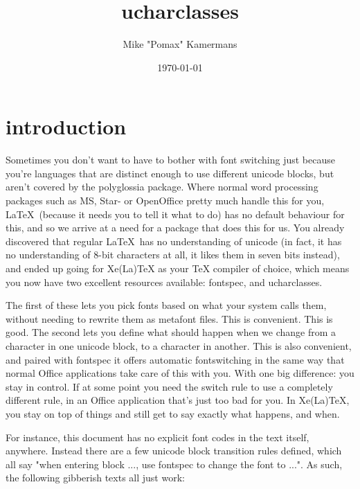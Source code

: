 ﻿\documentclass{article}
\begin{document}
	\title{ucharclasses}
	\author{Mike "Pomax" Kamermans}
	\date{\today}
	\maketitle

	\tableofcontents

	\pagebreak

	\section{introduction}
	
		Sometimes you don't want to have to bother with font switching just because you're languages that are distinct enough to use different unicode blocks, but aren't covered by the polyglossia package. Where normal word processing packages such as MS, Star- or OpenOffice pretty much handle this for you, \LaTeX\ (because it needs you to tell it what to do) has no default behaviour for this, and so we arrive at a need for a package that does this for us. You already discovered that regular \LaTeX\ has no understanding of unicode (in fact, it has no understanding of 8-bit characters at all, it likes them in seven bits instead), and ended up going for Xe(La)TeX as your TeX compiler of choice, which means you now have two excellent resources available: fontspec, and ucharclasses.
		
		The first of these lets you pick fonts based on what your system calls them, without needing to rewrite them as metafont files. This is convenient. This is good. The second lets you define what should happen when we change from a character in one unicode block, to a character in another. This is also convenient, and paired with fontspec it offers automatic fontswitching in the same way that normal Office applications take care of this with you. With one big difference: you stay in control. If at some point you need the switch rule to use a completely different rule, in an Office application that's just too bad for you. In Xe(La)TeX, you stay on top of things and still get to say exactly what happens, and when.
		
		For instance, this document has no explicit font codes in the text itself, anywhere. Instead there are a few unicode block transition rules defined, which all say "when entering block ..., use fontspec to change the font to ...". As such, the following gibberish texts all just work:
		
\end{document}
